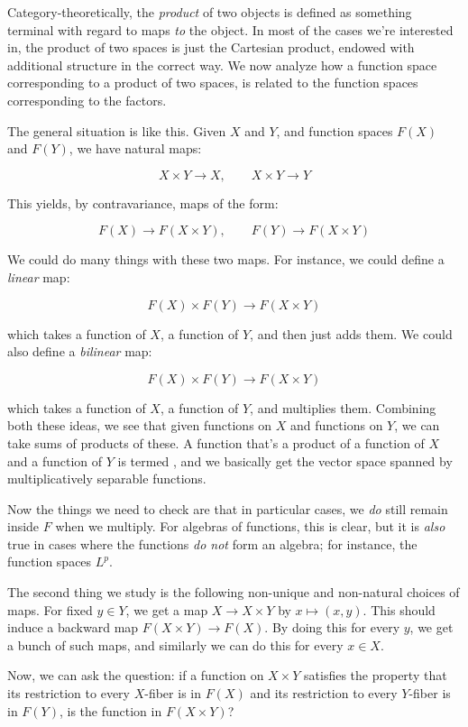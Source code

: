 \documentclass[a4paper]{amsart}
\begin{document}
Category-theoretically, the {\em product} of two objects is defined as
something terminal with regard to maps {\em to} the object. In most of
the cases we're interested in, the product of two spaces is just the
Cartesian product, endowed with additional structure in the correct
way. We now analyze how a function space corresponding to a product of
two spaces, is related to the function spaces corresponding to the factors.

The general situation is like this. Given $X$ and $Y$, and function
spaces $F(X)$ and $F(Y)$, we have natural maps:

$$X \times Y \to X, \qquad X \times Y \to Y$$

This yields, by contravariance, maps of the form:

$$F(X) \to F(X \times Y), \qquad F(Y) \to F(X \times Y)$$

We could do many things with these two maps. For instance, we could
define a {\em linear} map:

$$F(X) \times F(Y) \to F(X \times Y)$$

which takes a function of $X$, a function of $Y$, and then just adds
them. We could also define a {\em bilinear} map:

$$F(X) \times F(Y) \to F(X \times Y)$$

which takes a function of $X$, a function of $Y$, and multiplies
them. Combining both these ideas, we see that given functions on $X$
and functions on $Y$, we can take sums of products of these. A
function that's a product of a function of $X$ and a function of $Y$
is termed , and
we basically get the vector space spanned by multiplicatively
separable functions.

Now the things we need to check are that in particular cases, we {\em
  do} still remain inside $F$ when we multiply. For algebras of
functions, this is clear, but it is {\em also} true in cases where the functions
{\em do not} form an algebra; for instance, the function spaces $L^p$.

The second thing we study is the following non-unique and non-natural
choices of maps. For fixed $y \in Y$, we get a map $X \to X \times Y$
by $x \mapsto (x,y)$. This should induce a backward map $F(X \times Y)
\to F(X)$. By doing this for every $y$, we get a bunch of such maps,
and similarly we can do this for every $x \in X$.

Now, we can ask the question: if a function on $X \times Y$ satisfies
the property that its restriction to every $X$-fiber is in $F(X)$ and
its restriction to every $Y$-fiber is in $F(Y)$, is the function in
$F(X \times Y)$?
\end{document}
